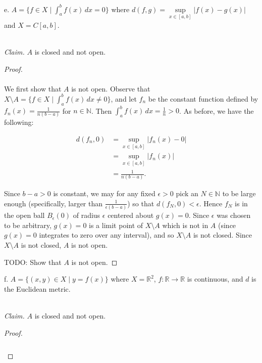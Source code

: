\pagebreak

e.  $A = \{ f \in X \mid \int_a^b{f(x) \,dx} = 0 \}$ where $d(f, g) = \sup\limits_{x \in [a, b]}{|f(x) - g(x)|}$ and 
    $X = C[a, b]$.

\ \\
\emph{Claim.} $A$ is closed and not open.

\begin{proof}\renewcommand{\qedsymbol}{}\ \\\\
    We first show that $A$ is not open. Observe that $X \setminus A = \{f \in X \mid \int_a^b{f(x) \,dx} \neq 0 \}$, and
    let $f_n$ be the constant function defined by $f_n(x) = \frac{1}{n(b - a)}$ for $n \in \mathbb{N}$. Then 
    $\int_a^b{f(x) \,dx} = \frac{1}{n} > 0$. As before, we have the following:


    \begin{align*}
         d(f_n, 0) &= \sup\limits_{x \in [a, b]}{|f_n(x) - 0|} \\ 
                   &= \sup\limits_{x \in [a, b]}{|f_n(x)|} \\ 
                   &= \frac{1}{n(b - a)}.
    \end{align*}

    Since $b - a > 0$ is constant, we may for any fixed $\epsilon > 0$ pick an $N \in \mathbb{N}$ to be large enough 
    (specifically, larger than $\frac{1}{\epsilon(b - a)}$) so that $d(f_N, 0) < \epsilon$. Hence $f_N$ is in
    the open ball $B_\epsilon(0)$ of radius $\epsilon$ centered about $g(x) = 0$. Since $\epsilon$ was chosen to be
    arbitrary, $g(x) = 0$ is a limit point of $X \setminus A$ which is not in $A$ (since $g(x) = 0$ integrates to zero 
    over any interval), and so $X \setminus A$ is not closed. Since $X \setminus A$ is not closed, $A$ is not open.

    TODO: Show that $A$ is not open.
\end{proof}

\pagebreak

f.  $A = \{ (x, y) \in X \mid y = f(x) \}$ where $X = \mathbb{R}^2$, $f:\mathbb{R} \to \mathbb{R}$ is continuous, and 
    $d$ is the Euclidean metric.

\ \\
\emph{Claim.} $A$ is closed and not open.

\begin{proof}\renewcommand{\qedsymbol}{}\ \\\\
    \begin{align*}
    \end{align*}
\end{proof}

\pagebreak